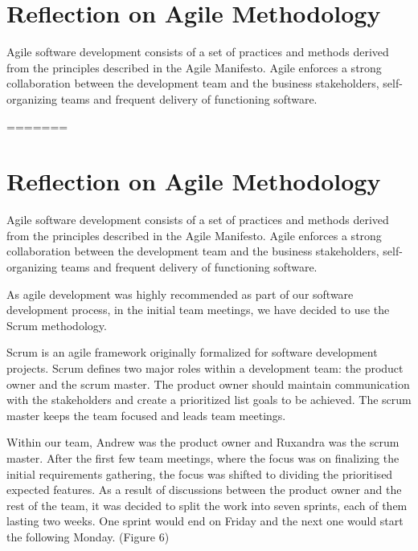\documentclass{l3proj}
\begin{document}



\newpage
\section{Reflection on Agile Methodology}
\label{sec:agile}


Agile software development consists of a set of practices and methods derived from the principles described in the Agile Manifesto. Agile enforces a strong collaboration between the development team and the business stakeholders, self-organizing teams and frequent delivery of functioning software.\cite{agile_overview}

=======
\section{Reflection on Agile Methodology}
\label{sec:agile}


Agile software development consists of a set of practices and methods derived from the principles described in the Agile Manifesto. Agile enforces a strong collaboration between the development team and the business stakeholders, self-organizing teams and frequent delivery of functioning software.\cite{agile_overview}

As agile development was highly recommended as part of our software development process, in the initial team meetings, we have decided to use the Scrum methodology.

 Scrum is an agile framework originally formalized for software development projects. Scrum defines two major roles within a development team: the product owner and the scrum master. The product owner should maintain communication with the stakeholders and create a prioritized list goals to be achieved. The scrum master keeps the team focused and leads team meetings.\cite{scrum_overview}

 Within our team, Andrew was the product owner and Ruxandra was the scrum master. After the first few team meetings, where the focus was on finalizing the initial requirements gathering, the focus was shifted to dividing the prioritised expected features. As a result of discussions between the product owner and the rest of the team, it was decided to split the work into seven sprints, each of them lasting two weeks. One sprint would end on Friday and the next one would start the following Monday. (Figure 6)
\end{document}
